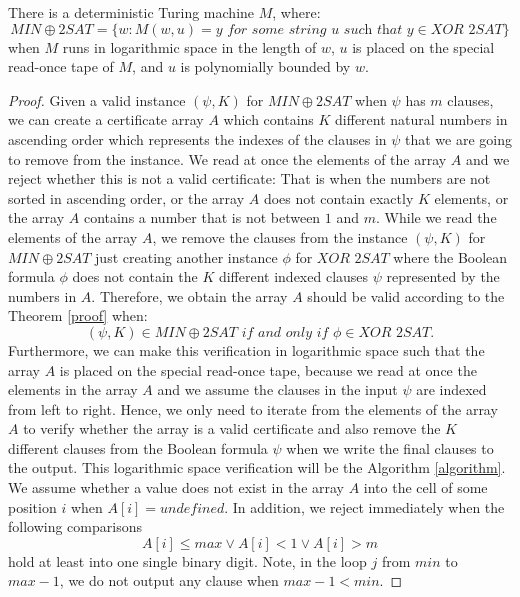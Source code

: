 \documentclass[a4paper,UKenglish,cleveref, autoref]{lipics-v2019}
\begin{document}
\begin{theorem}
\label{proof}
There is a deterministic Turing machine $M$, where:
\[MIN\oplus2SAT = \{w: M(w, u) = y \textit{ for some string } u \textit{ such that } y \in \textit{XOR 2SAT}\}\]
when $M$ runs in logarithmic space in the length of $w$, $u$ is placed on the special read-once tape of $M$, and $u$ is polynomially bounded by $w$.
\end{theorem}

\begin{proof}
Given a valid instance $(\psi, K)$ for $MIN\oplus2SAT$ when $\psi$ has $m$ clauses, we can create a certificate array $A$ which contains $K$ different natural numbers in ascending order which represents the indexes of the clauses in $\psi$ that we are going to remove from the instance. We read at once the elements of the array $A$ and we reject whether this is not a valid certificate: That is when the numbers are not sorted in ascending order, or the array $A$ does not contain exactly $K$ elements, or the array $A$ contains a number that is not between $1$ and $m$. While we read the elements of the array $A$, we remove the clauses from the instance $(\psi, K)$ for $MIN\oplus2SAT$ just creating another instance $\phi$ for $\textit{XOR 2SAT}$ where the Boolean formula $\phi$ does not contain the $K$ different indexed clauses $\psi$ represented by the numbers in $A$. Therefore, we obtain the array $A$ should be valid according to the Theorem \ref{proof} when:
\[(\psi, K) \in MIN\oplus2SAT \textit{ if and only if } \phi \in \textit{XOR 2SAT}.\]
Furthermore, we can make this verification in logarithmic space such that the array $A$ is placed on the special read-once tape, because we read at once the elements in the array $A$ and we assume the clauses in the input $\psi$ are indexed from left to right. Hence, we only need to iterate from the elements of the array $A$ to verify whether the array is a valid certificate and also remove the $K$ different clauses from the Boolean formula $\psi$ when we write the final clauses to the output. This logarithmic space verification will be the Algorithm \ref{algorithm}. We assume whether a value does not exist in the array $A$ into the cell of some position $i$ when $A[i] = undefined$. In addition, we reject immediately when the following comparisons
\[A[i] \leq max \vee A[i] < 1 \vee A[i] > m\]
hold at least into one single binary digit. Note, in the loop $j$ from $min$ to $max - 1$, we do not output any clause when $max - 1 < min$.


\end{proof}
\end{document}
